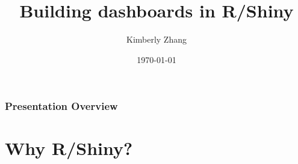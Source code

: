 \documentclass[
	11pt, %
]{beamer}
\title[]{Building dashboards in R/Shiny} %
\author[Kimberly Zhang]{Kimberly Zhang} %
\date[\today]{\today} %
\begin{document}

\begin{frame}
	\titlepage %
\end{frame}



\begin{frame}
	\frametitle{Presentation Overview} %
	
	\tableofcontents %
\end{frame}


\section{Why R/Shiny?}
\end{document}
